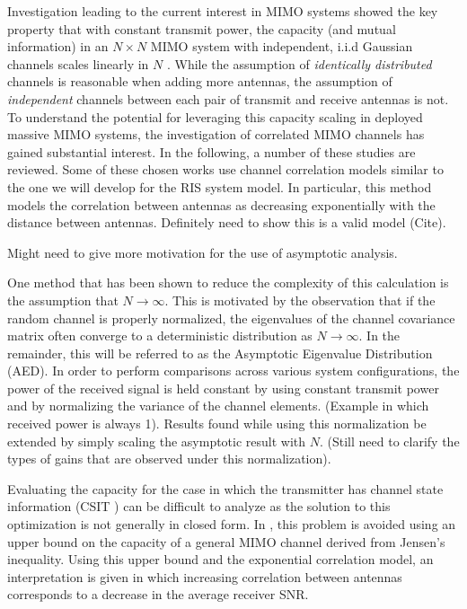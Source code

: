 \par
Investigation leading to the current interest in MIMO systems showed the key property that with constant transmit power, the capacity (and mutual information) in an $N \times N$ MIMO system with independent, i.i.d Gaussian channels scales linearly in $N$ \cite{foschini1998limits}. While the assumption of \emph{identically distributed} channels is reasonable when adding more antennas, the assumption of \emph{independent} channels between each pair of transmit and receive antennas is not. To understand the potential for leveraging this capacity scaling in deployed massive MIMO systems, the investigation of correlated MIMO channels has gained substantial interest. In the following, a number of these studies are reviewed. Some of these chosen works use channel correlation models similar to the one we will develop for the RIS system model. In particular, this method models the correlation between antennas as decreasing  exponentially with the distance between antennas. Definitely need to show this is a valid model (Cite).
\par
Might need to give more motivation for the use of asymptotic analysis.
\par
One method that has been shown to reduce the complexity of this calculation is the assumption that $N \rightarrow \infty$. 
This is motivated by the observation that if the random channel is properly normalized, the eigenvalues of the channel covariance matrix often converge to a deterministic distribution as $N \rightarrow \infty$. In the remainder, this will be referred to as the Asymptotic Eigenvalue Distribution (AED). 
In order to perform comparisons across various system configurations, the power of the received signal is held constant by using constant transmit power and by normalizing the variance of the channel elements. (Example in which received power is always 1).
Results found while using this normalization be extended by simply scaling the asymptotic result with $N$.
(Still need to clarify the types of gains that are observed under this normalization).
\par
Evaluating the capacity for the case in which the transmitter has channel state information (CSIT ) can be difficult to analyze as the solution to this optimization is not generally in closed form. In \cite{loyka2001channel}, this problem is avoided using an upper bound on the capacity of a general MIMO channel derived from Jensen's inequality. Using this upper bound and the exponential correlation model, an interpretation is given in which increasing correlation between antennas corresponds to a decrease in the average receiver SNR. 
